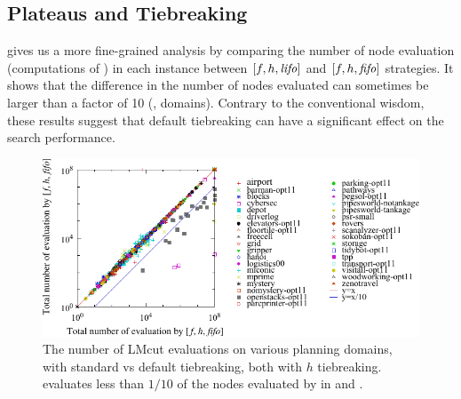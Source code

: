 
\subsection{Plateaus and Tiebreaking}

 gives us a
more fine-grained analysis by comparing the number of node evaluation
(computations of \lmcut) in each instance between $[f,h,{\text{\textit{lifo}}}]$ and $[f,h,{\text{\textit{fifo}}}]$ strategies.
It shows that the difference in the number of nodes
evaluated can sometimes be larger than a factor of 10 (,  domains).
Contrary to the conventional wisdom, 
these results suggest that default tiebreaking can have a significant effect on
the search performance.

\begin{figure}[htbp]
 \centering {}
 \includegraphics{tables/aaai16-30min-5min-cut/aaai16prelim3/evaluated-lmcut_ff-lmcut_lf.pdf}
 \caption{The number of LMcut evaluations on various planning domains,
 with standard \fifo vs \lifo default tiebreaking, both with $h$
 tiebreaking. \lifo evaluates  less than $1/10$ of the nodes evaluated
 by \fifo in  and . 
 }
 \label{fig:f-h-eval}
\end{figure}


